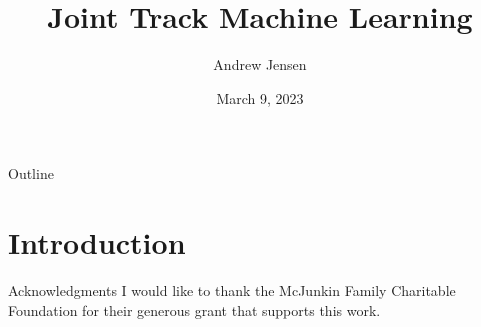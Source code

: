 \documentclass[aspectratio=1610]{beamer}
\author{Andrew Jensen}
\date{March 9, 2023}
\title{Joint Track Machine Learning}
\begin{document}
\renewcommand*{\bibfont}{\fontsize{10}{18}\selectfont}

\maketitle
\begin{frame}{Outline}
\tableofcontents
\end{frame}


\section{Introduction}
\label{sec:org8a3aa1b}
\begin{frame}[label={sec:org165699c}]{Acknowledgments}
I would like to thank the McJunkin Family Charitable Foundation for their generous grant that supports this work.
\end{frame}
\end{document}
